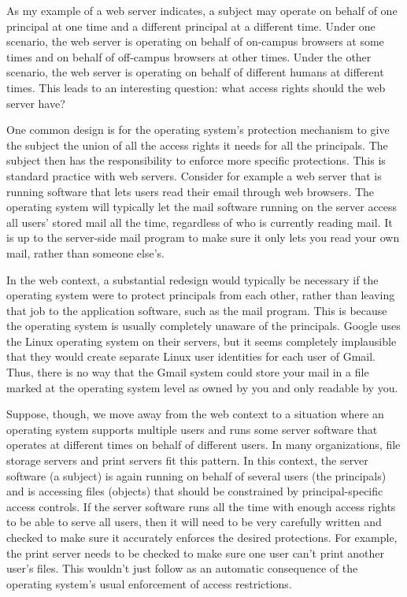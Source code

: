 As my example of a web server indicates, a subject may operate on
behalf of one principal at one time and a different principal at a
different time.  Under one scenario, the web server is operating on
behalf of on-campus browsers at some times and on behalf of off-campus
browsers at other times.  Under the other scenario, the web server is
operating on behalf of different humans at different times.  This leads
to an interesting question: what access rights should the web server have?

One common design is for the operating system's protection mechanism
to give the subject the union of all the access rights it needs for
all the principals.  The subject then has the responsibility to
enforce more specific protections.  This is standard practice with web
servers.  Consider for example a web server that is running software
that lets users read their email through web browsers.  The operating
system will typically let the mail software running on the server
access all users' stored mail all the time, regardless of who is
currently reading mail.  It is up to the server-side mail program to
make sure it only lets you read your own mail, rather than someone
else's.

In the web context, a substantial redesign would typically be
necessary if the operating system were to protect principals from each
other, rather than leaving that job to the application software, such
as the mail program.  This is because the operating system is usually
completely unaware of the principals.  Google uses the Linux operating
system on their servers, but it seems completely implausible that they
would create separate Linux user identities for each user of Gmail.
Thus, there is no way that the Gmail system could store your mail in a
file marked at the operating system level as owned by you and only
readable by you.

Suppose, though, we move away from the web context to a situation
where an operating system supports multiple users and runs some server
software that operates at different times on behalf of different
users.  In many organizations, file storage servers and print servers
fit this pattern.  In this context, the server software (a subject) is
again running on behalf of several users (the principals) and is
accessing files (objects) that should be constrained by
principal-specific access controls.  If the server software runs all
the time with enough access rights to be able to serve all users, then
it will need to be very carefully written and checked to make sure it
accurately enforces the desired protections.  For example, the print
server needs to be checked to make sure one user can't print another
user's files.  This wouldn't just follow as an automatic consequence
of the operating system's usual enforcement of access restrictions.

